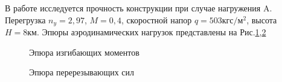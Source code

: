 В работе исследуется прочность конструкции при случае нагружения A. Перегрузка $n_y = 2,97$, $M = 0,4$, скоростной напор $q = 503 \text{кгс}/\text{м}^2$, высота $H = 8\text{км}$. Эпюры аэродинамических нагрузок представлены на Рис.\ref{fig:BendingMoments},\ref{fig:CuttingForces}



\begin{figure}[H]
\centering
\def\svgwidth{0.9\textwidth}

\caption{Эпюра изгибающих моментов}
\label{fig:BendingMoments}
\end{figure}

\begin{figure}[H]
\centering
\def\svgwidth{0.9\textwidth}

\caption{Эпюра перерезывающих сил}
\label{fig:CuttingForces}
\end{figure}
